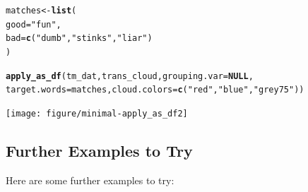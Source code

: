 \documentclass{article}\usepackage[]{graphicx}\usepackage[]{color}
\makeatletter
\newcommand{\hlstr}[1]{\textcolor[rgb]{0.192,0.494,0.8}{#1}}%
\newcommand{\hlstd}[1]{\textcolor[rgb]{0.345,0.345,0.345}{#1}}%
\newcommand{\hlkwa}[1]{\textcolor[rgb]{0.161,0.373,0.58}{\textbf{#1}}}%
\newcommand{\hlkwb}[1]{\textcolor[rgb]{0.69,0.353,0.396}{#1}}%
\newcommand{\hlkwc}[1]{\textcolor[rgb]{0.333,0.667,0.333}{#1}}%
\newcommand{\hlkwd}[1]{\textcolor[rgb]{0.737,0.353,0.396}{\textbf{#1}}}%
\newenvironment{kframe}{%
 \def\at@end@of@kframe{}%
 \ifinner\ifhmode%
  \def\at@end@of@kframe{\end{minipage}}%
  \begin{minipage}{\columnwidth}%
 \fi\fi%
 \def\FrameCommand##1{\hskip\@totalleftmargin \hskip-\fboxsep
 \colorbox{shadecolor}{##1}\hskip-\fboxsep
     \hskip-\linewidth \hskip-\@totalleftmargin \hskip\columnwidth}%
 \MakeFramed {\advance\hsize-\width
   \@totalleftmargin\z@ \linewidth\hsize
   \@setminipage}}%
 {\par\unskip\endMakeFramed%
 \at@end@of@kframe}
\newenvironment{knitrout}{}{} %
\makeatother
\begin{document}
\begin{knitrout}
\color{fgcolor}\begin{kframe}
\begin{alltt}
\hlstd{matches} \hlkwb{<-} \hlkwd{list}\hlstd{(}
    \hlkwc{good} \hlstd{=} \hlstr{"fun"}\hlstd{,}
    \hlkwc{bad} \hlstd{=} \hlkwd{c}\hlstd{(}\hlstr{"dumb"}\hlstd{,} \hlstr{"stinks"}\hlstd{,} \hlstr{"liar"}\hlstd{)}
\hlstd{)}

\hlkwd{apply_as_df}\hlstd{(tm_dat, trans_cloud,} \hlkwc{grouping.var}\hlstd{=}\hlkwa{NULL}\hlstd{,}
    \hlkwc{target.words}\hlstd{=matches,} \hlkwc{cloud.colors} \hlstd{=} \hlkwd{c}\hlstd{(}\hlstr{"red"}\hlstd{,} \hlstr{"blue"}\hlstd{,} \hlstr{"grey75"}\hlstd{))}
\end{alltt}
\end{kframe}
\end{knitrout}


\begin{knitrout}
\color{fgcolor}

{\centering \texttt{[image: figure/minimal-apply\_as\_df2]} 

}



\end{knitrout}


\subsection{Further Examples to Try}

\hspace{.4cm} Here are some further examples to try:
\end{document}

